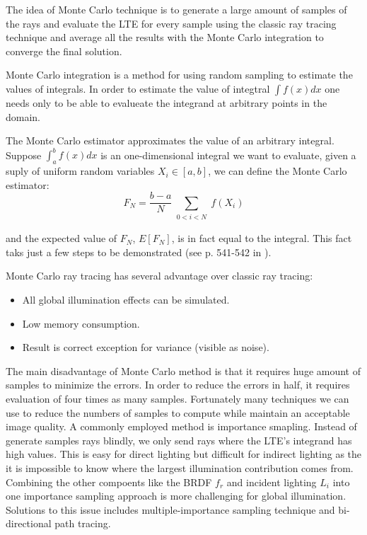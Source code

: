 The idea of Monte Carlo technique is to generate a large amount of samples of the rays and evaluate the LTE for every sample using the classic ray tracing technique and average all the results with the Monte Carlo integration to converge the final solution. 

Monte Carlo integration is a method for using random sampling to estimate the values of integrals. In order to estimate the value of integtral \( \int f(x)dx \) one needs only to be able to evalueate the integrand at arbitrary points in the domain. 

The Monte Carlo estimator approximates the value of an arbitrary integral. Suppose \( \int_{a}^{b}f(x)dx \) is an one-dimensional integral we want to evaluate, given a suply of uniform random variables \( X_{i} \in [a, b] \), we can define the Monte Carlo estimator: 
\begin{equation}
F_{N} = \frac{b-a}{N}\sum_{\substack{0<i<N}}f(X_{i})
\end{equation}

and the expected value of \(F_{N}\), \(E[F_{N}]\), is in fact equal to the integral. This fact taks just a few steps to be demonstrated (see p. 541-542 in \cite{Pharr:2010:PBR:1854996}). 

Monte Carlo ray tracing has several advantage over classic ray tracing: 

\begin{itemize} 

\item All global illumination effects can be simulated.

\item Low memory consumption. 

\item Result is correct exception for variance (visible as noise). 

\end{itemize} 

The main disadvantage of Monte Carlo method is that it requires huge amount of samples to minimize the errors. In order to reduce the errors in half, it requires evaluation of four times as many samples. Fortunately many techniques we can use to reduce the numbers of samples to compute while maintain an acceptable image quality. A commonly employed method is importance smapling. Instead of generate samples rays blindly, we only send rays where the LTE's integrand has high values. This is easy for direct lighting but difficult for indirect lighting as the it is impossible to know where the largest illumination contribution comes from. Combining the other compoents like the BRDF \(f_{r}\) and incident lighting \(L_{i}\) into one importance sampling approach is more challenging for global illumination. Solutions to this issue includes multiple-importance sampling technique and bi-directional path tracing\cite{Lafortune93bi-directionalpath}.


